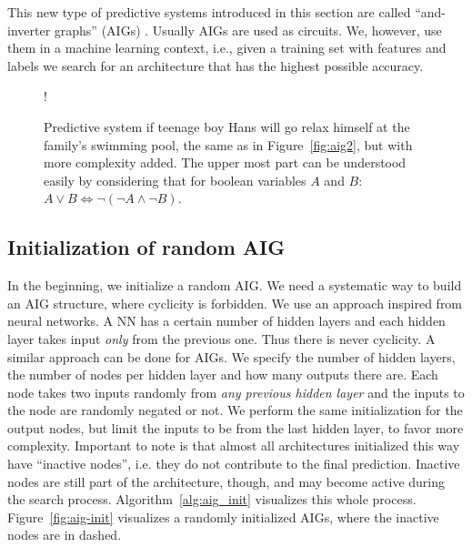 This new type of predictive systems introduced in this section are called \enquote{and-inverter graphs} (AIGs) \cite{bib:aig_wiki}. Usually AIGs are used as circuits. We, however, use them in a machine learning context, i.e., given a training set with features and labels we search for an architecture that has the highest possible accuracy.

\begin{figure}[!htb]
    \centering
    \resizebox {0.65\textwidth} {!} {
      
    }
    \caption{Predictive system if teenage boy Hans will go relax himself at the family's swimming pool, the same as in Figure~\ref{fig:aig2}, but with more complexity added. The upper most part can be understood easily by considering that for boolean variables $A$ and $B$: $A \vee B \Leftrightarrow \lnot (\lnot A \wedge \lnot B)$.}
\label{fig:aig3}
\end{figure}
\FloatBarrier


\subsection{Initialization of random AIG}
In the beginning, we initialize a random AIG. We need a systematic way to build an AIG structure, where cyclicity is forbidden. We use an approach inspired from neural networks. A NN has a certain number of hidden layers and each hidden layer takes input \textit{only} from the previous one. Thus there is never cyclicity. A similar approach can be done for AIGs. We specify the number of hidden layers, the number of nodes per hidden layer and how many outputs there are. Each node takes two inputs randomly from \textit{any previous hidden layer} and the inputs to the node are randomly negated or not. We perform the same initialization for the output nodes, but limit the inputs to be from the last hidden layer, to favor more complexity. Important to note is that almost all architectures initialized this way have \enquote{inactive nodes}, i.e. they do not contribute to the final prediction. Inactive nodes are still part of the architecture, though, and may become active during the search process. Algorithm~\ref{alg:aig_init} visualizes this whole process. Figure~\ref{fig:aig-init} visualizes a randomly initialized AIGs, where the inactive nodes are in dashed.

